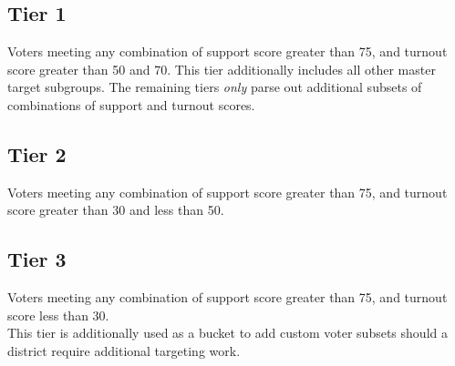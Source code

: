 \documentclass[12pt]{article}
\begin{document}
\subsection*{Tier 1}

Voters meeting any combination of support score greater than 75, and turnout score greater than 50 and 70. This tier additionally includes all other master target subgroups. The remaining tiers \textit{only} parse out additional subsets of combinations of support and turnout scores.\\

\subsection*{Tier 2}
Voters meeting any combination of support score greater than 75, and turnout score greater than 30 and less than 50.\\

\subsection*{Tier 3}
Voters meeting any combination of support score greater than 75, and turnout score less than 30.\\

This tier is additionally used as a bucket to add custom voter subsets should a district require additional targeting work.

\newpage
\theendnotes
\end{document}
